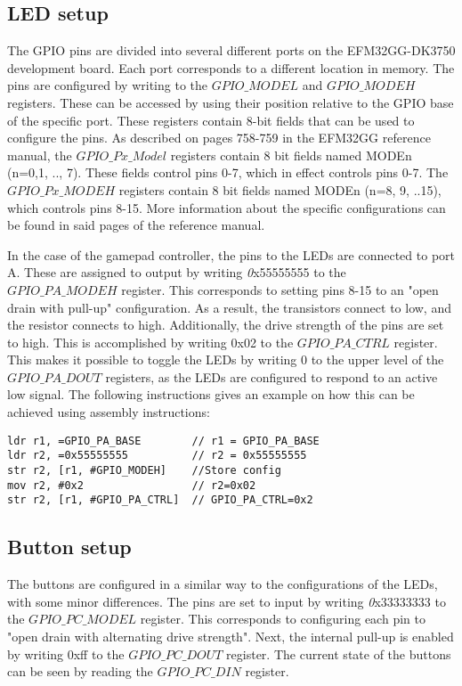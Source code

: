 \subsection{LED setup}\label{led-setup}

The GPIO pins are divided into several different ports on the EFM32GG-DK3750 development board. Each port corresponds to a different location in memory.  The pins are configured by writing to the $GPIO\_MODEL$ and $GPIO\_MODEH$ registers. These can be accessed by using their position relative to the GPIO base of the specific port. These registers contain 8-bit fields that can be used to configure the pins. As described on pages 758-759 in the EFM32GG reference manual, the $GPIO\_Px\_Model$ registers contain 8 bit fields named MODEn (n=0,1, .., 7). These fields control pins 0-7, which in effect controls pins 0-7. The $GPIO\_Px\_MODEH$ registers contain 8 bit fields named MODEn (n=8, 9, ..15), which controls pins 8-15. More information about the specific configurations can be found in said pages of the reference manual.

In the case of the gamepad controller, the pins to the LEDs are connected to port A. These are assigned to output by writing {\emph 0x55555555} to  the $GPIO\_PA\_MODEH$ register. This corresponds to setting pins 8-15 to an "open drain with pull-up" configuration\cite[p.758-759]{EFM32GG-rm}. As a result, the transistors connect to low, and the resistor connects to high. Additionally, the drive strength of the pins are set to high. This is accomplished by writing 0x02 to the $GPIO\_PA\_CTRL$ register. This makes it possible to toggle the LEDs by writing 0 to the upper level of the $GPIO\_PA\_DOUT$ registers, as the LEDs are configured to respond to an active low signal. The following instructions gives an example on how this can be achieved using assembly instructions:


\begin{lstlisting}
ldr r1, =GPIO_PA_BASE        // r1 = GPIO_PA_BASE
ldr r2, =0x55555555          // r2 = 0x55555555  
str r2, [r1, #GPIO_MODEH]    //Store config
mov r2, #0x2                 // r2=0x02
str r2, [r1, #GPIO_PA_CTRL]  // GPIO_PA_CTRL=0x2                    

\end{lstlisting}


 

\subsection{Button setup}\label{ch:buttons}
The buttons are configured in a similar way to the configurations of the LEDs, with some minor differences. The pins are set to input by writing {\emph 0x33333333} to the $GPIO\_PC\_MODEL$ register. This corresponds to configuring each pin to "open drain with alternating drive strength"\cite[p.758-759]{EFM32GG-rm}. Next, the internal pull-up is enabled by writing 0xff to the $GPIO\_PC\_DOUT$ register. The current state of the buttons can be seen by reading the $GPIO\_PC\_DIN$ register. 

